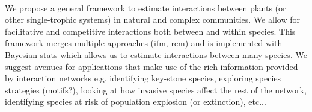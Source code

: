 \documentclass[a4,12pt]{article}
\begin{document}
    
    \paragraph{}
    We propose a general framework to estimate interactions between plants (or other single-trophic systems) in natural and complex communities. We allow for facilitative and competitive interactions both between and within species. 
    This framework merges multiple approaches (ifm, rem) and is implemented with Bayesian stats which allows us to estimate interactions between many species. 
    We suggest avenues for applications that make use of the rich information provided by interaction networks e.g. identifying key-stone species, exploring species strategies (motifs?), looking at how invasive species affect the rest of the network, identifying species at risk of population explosion (or extinction), etc...



    
\end{document}
